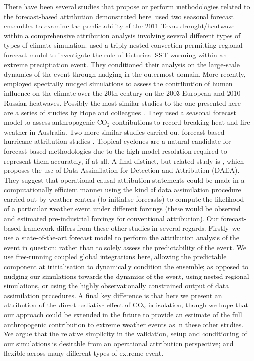   There have been several studies that propose or perform methodologies related to the forecast-based attribution demonstrated here. \citet{hoerling_anatomy_2013} used two seasonal forecast ensembles to examine the predictability of the 2011 Texas drought/heatwave within a comprehensive attribution analysis involving several different types of types of climate simulation. \citet{meredith_crucial_2015} used a triply nested convection-permitting regional forecast model to investigate the role of historical SST warming within an extreme precipitation event. They conditioned their analysis on the large-scale dynamics of the event through nudging in the outermost domain. More recently, \citet{van_garderen_methodology_2021} employed spectrally nudged simulations to assess the contribution of human influence on the climate over the 20th century on the 2003 European and 2010 Russian heatwaves. Possibly the most similar studies to the one presented here are a series of studies by Hope and colleagues \citep{hope_contributors_2015,hope_what_2016,hope_determining_2019}. They used a seasonal forecast model to assess anthropogenic CO$_2$ contributions to record-breaking heat and fire weather in Australia. Two more similar studies carried out forecast-based hurricane attribution studies \citep{reed_forecasted_2020,lackmann_hurricane_2015}. Tropical cyclones are a natural candidate for forecast-based methodologies due to the high model resolution required to represent them accurately, if at all. A final distinct, but related study is \citet{hannart_dada_2016}, which proposes the use of Data Assimilation for Detection and Attribution (DADA). They suggest that operational causal attribution statements could be made in a computationally efficient manner using the kind of data assimilation procedure carried out by weather centers (to initialise forecasts) to compute the likelihood of a particular weather event under different forcings (these would be observed and estimated pre-industrial forcings for conventional attribution). Our forecast-based framework differs from these other studies in several regards. Firstly, we use a state-of-the-art forecast model to perform the attribution analysis of the event in question; rather than to solely assess the predictability of the event. We use free-running coupled global integrations here, allowing the predictable component at initialisation to dynamically condition the ensemble; as opposed to nudging our simulations towards the dynamics of the event, using nested regional simulations, or using the highly observationally constrained output of data assimilation procedures. A final key difference is that here we present an attribution of the direct radiative effect of CO$_2$ in isolation, though we hope that our approach could be extended in the future to provide an estimate of the full anthropogenic contribution to extreme weather events as in these other studies. We argue that the relative simplicity in the validation, setup and conditioning of our simulations is desirable from an operational attribution perspective; and flexible across many different types of extreme event. 

